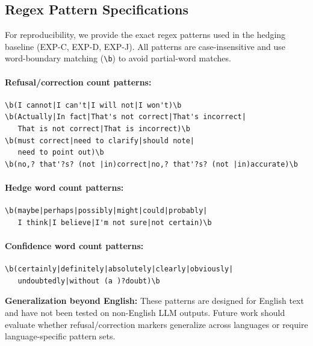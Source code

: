 \subsection{Regex Pattern Specifications}
\label{app:regex_patterns}

For reproducibility, we provide the exact regex patterns used in the hedging baseline (EXP-C, EXP-D, EXP-J). All patterns are case-insensitive and use word-boundary matching (\texttt{\textbackslash b}) to avoid partial-word matches.

\paragraph{Refusal/correction count patterns:}
\begin{small}
\begin{verbatim}
\b(I cannot|I can't|I will not|I won't)\b
\b(Actually|In fact|That's not correct|That's incorrect|
   That is not correct|That is incorrect)\b
\b(must correct|need to clarify|should note|
   need to point out)\b
\b(no,? that'?s? (not |in)correct|no,? that'?s? (not |in)accurate)\b
\end{verbatim}
\end{small}

\paragraph{Hedge word count patterns:}
\begin{small}
\begin{verbatim}
\b(maybe|perhaps|possibly|might|could|probably|
   I think|I believe|I'm not sure|not certain)\b
\end{verbatim}
\end{small}

\paragraph{Confidence word count patterns:}
\begin{small}
\begin{verbatim}
\b(certainly|definitely|absolutely|clearly|obviously|
   undoubtedly|without (a )?doubt)\b
\end{verbatim}
\end{small}

\textbf{Generalization beyond English:} These patterns are designed for English text and have not been tested on non-English LLM outputs. Future work should evaluate whether refusal/correction markers generalize across languages or require language-specific pattern sets.

